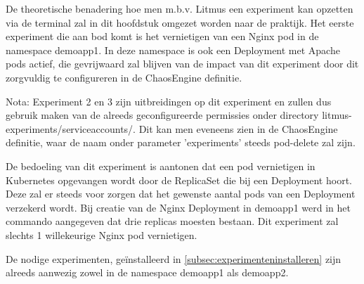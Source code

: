 De theoretische benadering hoe men m.b.v. Litmus een experiment kan opzetten via de terminal zal in dit hoofdstuk omgezet worden naar de praktijk. Het eerste experiment die aan bod komt is het vernietigen van een Nginx pod in de namespace demoapp1. In deze namespace is ook een Deployment met Apache pods actief, die gevrijwaard zal blijven van de impact van dit experiment door dit zorgvuldig te configureren in de ChaosEngine definitie. 

Nota: Experiment 2 en 3 zijn uitbreidingen op dit experiment en zullen dus gebruik maken van de alreeds geconfigureerde permissies onder directory litmus-experiments/serviceaccounts/. Dit kan men eveneens zien in de ChaosEngine definitie, waar de naam onder parameter 'experiments' steeds pod-delete zal zijn. 

De bedoeling van dit experiment is aantonen dat een pod vernietigen in Kubernetes opgevangen wordt door de ReplicaSet die bij een Deployment hoort. Deze zal er steeds voor zorgen dat het gewenste aantal pods van een Deployment verzekerd wordt. Bij creatie van de Nginx Deployment in demoapp1 werd in het commando aangegeven dat drie replicas moesten bestaan. Dit experiment zal slechts 1 willekeurige Nginx pod vernietigen.  

De nodige experimenten, geïnstalleerd in \ref{subsec:experimenteninstalleren} zijn alreeds aanwezig zowel in de namespace demoapp1 als demoapp2.
  
